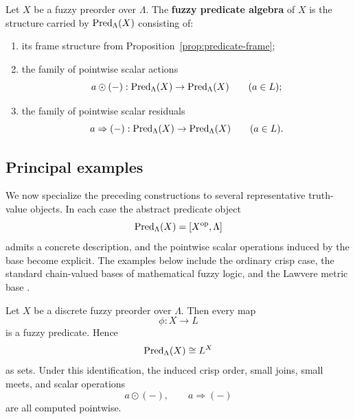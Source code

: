 \begin{definition}
\label{def:fuzzy-predicate-algebra}
    Let \(X\) be a fuzzy preorder over \(\Lambda\). The \textbf{fuzzy predicate algebra} of \(X\) is the structure carried by \(\mathrm{Pred}_\Lambda(X)\) consisting of:
    \begin{enumerate}
        \item its frame structure from Proposition~\ref{prop:predicate-frame};

        \item the family of pointwise scalar actions
        \[
            a\odot(-):\mathrm{Pred}_\Lambda(X)\to \mathrm{Pred}_\Lambda(X)
            \qquad
            (a\in L);
        \]

        \item the family of pointwise scalar residuals
        \[
            a\Rightarrow(-):\mathrm{Pred}_\Lambda(X)\to \mathrm{Pred}_\Lambda(X)
            \qquad
            (a\in L).
        \]
    \end{enumerate}
\end{definition}

\subsection{Principal examples}
\label{subsec:principal-examples}

We now specialize the preceding constructions to several representative truth-value objects. In each case the abstract predicate object
\[
    \mathrm{Pred}_\Lambda(X)=[X^{\mathrm{op}},\Lambda]
\]
admits a concrete description, and the pointwise scalar operations induced by the base become explicit. The examples below include the ordinary crisp case, the standard chain-valued bases of mathematical fuzzy logic, and the Lawvere metric base \cite{Goguen1967LFuzzySets,Lawvere1973MetricSpaces} \cite[Example~2.4]{stubbe-2014-quantaloid-enriched}\cite[Sections~1, 2, and~7]{sep-logic-fuzzy}.

\begin{proposition}
\label{prop:discrete-predicate-object}
    Let \(X\) be a discrete fuzzy preorder over \(\Lambda\). Then every map
    \[
        \phi:X\to L
    \]
    is a fuzzy predicate. Hence
    \[
        \mathrm{Pred}_\Lambda(X)\cong L^X
    \]
    as sets. Under this identification, the induced crisp order, small joins, small meets, and scalar operations
    \[
        a\odot(-),
        \qquad
        a\Rightarrow(-)
    \]
    are all computed pointwise.
\end{proposition}

